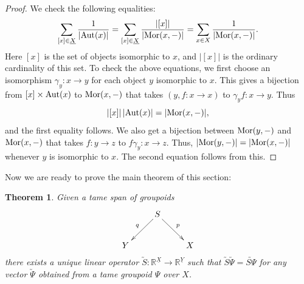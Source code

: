 \documentclass{article}
\renewcommand{\to}{\rightarrow}
\newcommand{\maps}{\colon}
\newcommand{\R}{{\mathbb R}}
\newcommand{\Aut}{{\rm Aut}}
\newcommand{\Mor}{{\rm Mor}}
\renewcommand{\u}[1]{\underline{#1}}
\newtheorem{thm}{Theorem}
\begin{document}
\begin{proof}
We check the following equalities:
\[  \sum_{[x] \in \u{X}} \frac{1}{|\Aut(x)|} 
= \sum_{[x] \in \u{X}} \frac{|[x]|}{|\Mor(x,-)|} 
= \sum_{x \in X} \frac{1}{|\Mor(x,-)|} .\]
Here $[x]$ is the set of objects isomorphic to $x$, and $|[x]|$ is the
ordinary cardinality of this set.  To check the above equations, we first
choose an isomorphism $\gamma_y \maps x \to y$ for each object $y$ isomorphic
to $x$.  This gives a bijection from $[x] \times 
\Aut(x)$ to $\Mor(x,-)$ that takes $(y, f \maps x \to x)$ to
$\gamma_y f \maps x \to y$.  Thus
\[         |[x]| \, |\Aut(x)| = |\Mor(x,-)| , \]
and the first equality follows.  We also get a bijection between
$\Mor(y,-)$ and $\Mor(x,-)$ that takes $f \maps y \to z$ to
$f\gamma_y \maps x \to z$.  Thus, $|\Mor(y,-)| = |\Mor(x,-)|$ whenever
$y$ is isomorphic to $x$.  The second equation follows from this.
\end{proof}

Now we are ready to prove the main theorem of this section:

\begin{thm}\label{PROCESS1}
Given a tame span of groupoids
\[
\xymatrix{
& S \ar[dl]_{q} \ar[dr]^{p} & \\
Y && X
}
\]
there exists a unique linear operator 
$\utilde{S} \maps \R^{\u{X}} \to \R^{\u{Y}}$
such that $\utilde{S}\utilde{\Psi} = \utilde{S\Psi}$ for 
any vector $\utilde{\Psi}$ obtained from a tame groupoid $\Psi$
over $X$.
\end{thm}
\end{document}
